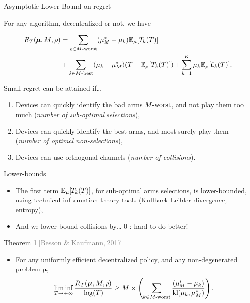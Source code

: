 \documentclass[12pt,english,ignorenonframetext,]{beamer}
\providecommand{\tightlist}{%
  \setlength{\itemsep}{0pt}\setlength{\parskip}{0pt}}
\begin{document}
\begin{frame}[allowframebreaks]{Asymptotic Lower Bound on regret}

For any algorithm, decentralized or not, we have \vspace*{-20pt}

\begin{small}\begin{align*}
R_T(\boldsymbol{\mu}, M, \rho) &= \sum_{k \in M\text{-}\mathrm{worst}} (\mu_M^* -  \mu_k) \mathbb{E}_{\mu}[T_k(T)] \\
&+ \sum_{k \in M\text{-}\mathrm{best}} (\mu_k -  \mu_M^*) (T - \mathbb{E}_{\mu}[T_k(T)]) + \sum_{k=1}^{K} \mu_k \mathbb{E}_{\mu}[\mathcal{C}_k(T)].
\end{align*}\end{small}

\begin{block}{Small regret can be attained if\ldots{}}

\begin{enumerate}
\def\labelenumi{\arabic{enumi}.}
\tightlist
\item
  Devices can quickly identify the bad arms \(M\text{-}\mathrm{worst}\), and not play
  them too much (\emph{number of sub-optimal selections}),
\item
  Devices can quickly identify the best arms, and most surely play them
  (\emph{number of optimal non-selections}),
\item
  Devices can use orthogonal channels (\emph{number of collisions}).
\end{enumerate}

\end{block}

\begin{block}{Lower-bounds}

\begin{itemize}
\tightlist
\item
  The first term \(\mathbb{E}_{\mu}[T_k(T)]\), for sub-optimal arms selections,
  is lower-bounded, using technical information theory tools
  (Kullback-Leibler divergence, entropy),
\item
  And we lower-bound collisions by\ldots{} \(0\) : hard to do better!
\end{itemize}

\end{block}

\begin{block}{Theorem 1
\hfill{}\textcolor{gray}{[Besson \& Kaufmann, 2017]}}

\begin{itemize}
\tightlist
\item
  For any uniformly efficient decentralized policy, and any
  non-degenerated problem \(\boldsymbol{\mu}\), \vspace*{-10pt}
  \[ \mathop{\lim\inf}\limits_{T \to +\infty} \frac{R_T(\boldsymbol{\mu}, M, \rho)}{\log(T)} \geq M \times \left( \sum_{k \in M\text{-}\mathrm{worst}} \frac{(\mu_M^* -  \mu_k)}{\mathrm{kl}(\mu_k, \mu_M^*)} \right) . \]
\end{itemize}


\end{block}
\end{frame}
\end{document}
